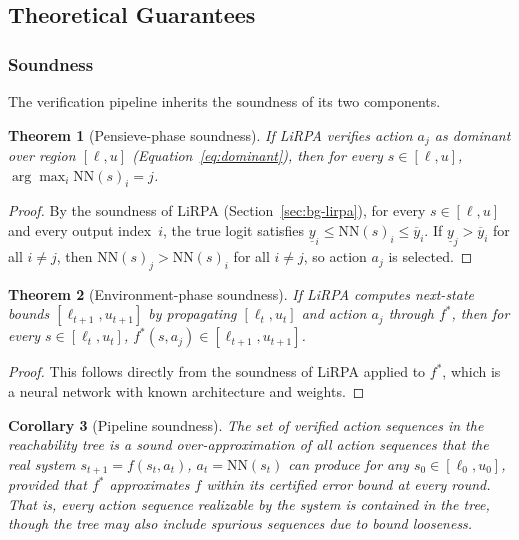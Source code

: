 \documentclass[thesis]{uofithesis} %
\newtheorem{theorem}{Theorem}[section]
\newtheorem{corollary}[theorem]{Corollary}
\begin{document}
    \subsection{Theoretical Guarantees}
    \label{sec:verify-theory}


    \subsubsection{Soundness}
    \label{sec:verify-soundness}

    The verification pipeline inherits the soundness of its two components.

    \begin{theorem}[Pensieve-phase soundness]
    \label{thm:pensieve-sound}
    If LiRPA verifies action $a_j$ as dominant over region $[\ell, u]$
    (Equation~\ref{eq:dominant}), then for every $s \in [\ell, u]$,
    $\arg\max_i \mathrm{NN}(s)_i = j$.
    \end{theorem}

    \begin{proof}
    By the soundness of LiRPA (Section~\ref{sec:bg-lirpa}), for every
    $s \in [\ell, u]$ and every output index~$i$, the true logit satisfies
    $\underline{y}_i \leq \mathrm{NN}(s)_i \leq \overline{y}_i$.  If
    $\underline{y}_j > \overline{y}_i$ for all $i \neq j$, then
    $\mathrm{NN}(s)_j > \mathrm{NN}(s)_i$ for all $i \neq j$, so action
    $a_j$ is selected.
    \end{proof}

    \begin{theorem}[Environment-phase soundness]
    \label{thm:env-sound}
    If LiRPA computes next-state bounds $[\ell_{t+1}, u_{t+1}]$ by
    propagating $[\ell_t, u_t]$ and action $a_j$ through $f^{\ast}$, then
    for every $s \in [\ell_t, u_t]$,
    $f^{\ast}(s, a_j) \in [\ell_{t+1}, u_{t+1}]$.
    \end{theorem}

    \begin{proof}
    This follows directly from the soundness of LiRPA applied to
    $f^{\ast}$, which is a neural network with known architecture and
    weights.
    \end{proof}

    \begin{corollary}[Pipeline soundness]
    \label{cor:pipeline-sound}
    The set of verified action sequences in the reachability tree is a
    sound over-approximation of all action sequences that the real
    system $s_{t+1} = f(s_t, a_t)$, $a_t = \mathrm{NN}(s_t)$ can
    produce for any $s_0 \in [\ell_0, u_0]$, provided that
    $f^{\ast}$ approximates $f$ within its certified error bound at
    every round.  That is, every action sequence realizable by the
    system is contained in the tree, though the tree may also include
    spurious sequences due to bound looseness.
    \end{corollary}
\end{document}
